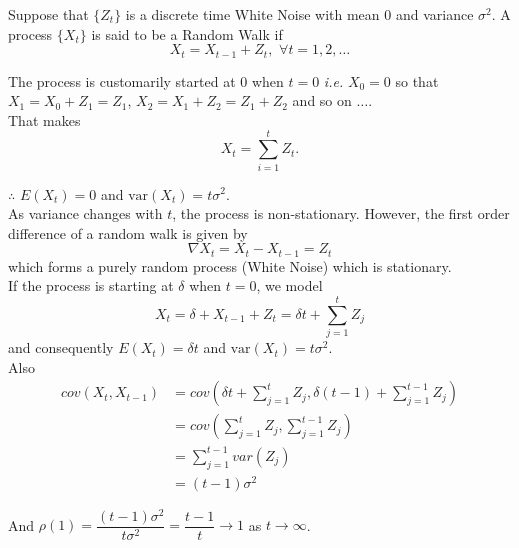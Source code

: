 \documentclass[11pt, a4paper]{article}
\numberwithin{equation}{section}
\theoremstyle{definition}
\begin{document}
Suppose that $\{Z_t\}$ is a discrete time White Noise with mean $0$ and variance $\sigma^2$. A process $\{X_t\}$ is said to be a Random Walk if
\begin{equation}\label{randomwalk}
X_t = X_{t-1} + Z_t, \,\, \forall t = 1, 2, \ldots
\end{equation}

The process is customarily started at $0$ when $t = 0$ \textit{i.e.} $X_0 = 0$ so that $X_1 = X_0 + Z_1 = Z_1$, $X_2 = X_1 + Z_2 = Z_1 + Z_2$ and so on $\ldots$. \\[0.25em]

That makes
\begin{equation*}
X_t = \sum \limits_{i = 1}^{t} Z_t.
\end{equation*}

$\therefore$ $E(X_t) = 0$ and $\text{var}(X_t) = t\sigma^2$. \\[0.25em]

As variance changes with $t$, the process is non-stationary. However, the first order difference of a random walk is given by 
\begin{equation*}
\nabla X_t = X_t - X_{t-1} = Z_t
\end{equation*}
which forms a purely random process (White Noise) which is stationary. \\[0.25em]

If the process is starting at $\delta$ when $t = 0$, we model
\begin{equation*}
X_t = \delta + X_{t-1} + Z_t = \delta t + \sum \limits_{j = 1}^{t} Z_j
\end{equation*}
and consequently $E(X_t) = \delta t$ and $\text{var}(X_t) = t\sigma^2$. \\[0.25em]

Also 
\begin{align*}
cov(X_t, X_{t-1}) &= cov\left(\delta t + \sum \limits_{j = 1}^{t} Z_j, \delta (t-1) + \sum \limits_{j = 1}^{t-1} Z_j \right) \\[0.25em]
&= cov\left(\sum \limits_{j = 1}^{t} Z_j, \sum \limits_{j = 1}^{t-1} Z_j \right) \\[0.25em]
&= \sum \limits_{j = 1}^{t-1} var(Z_j) \\[0.25em]
&= (t-1) \sigma^2
\end{align*}

And $\rho(1) = \dfrac{(t-1)\sigma^2}{t\sigma^2} = \dfrac{t-1}{t} \rightarrow 1$ as $t \rightarrow \infty$. \\[0.5em]

\newpage
\end{document}

